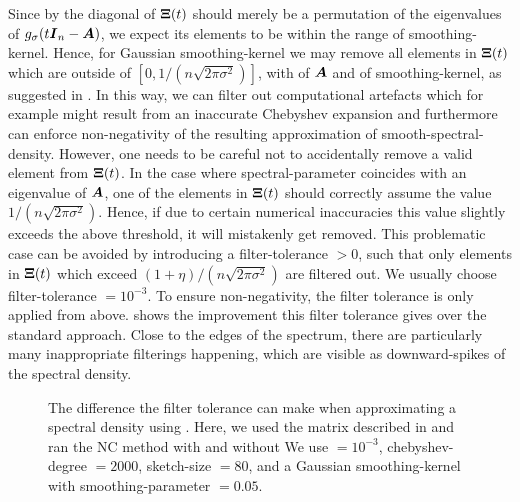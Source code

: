 Since by  the diagonal of $\boldsymbol{\Xi}(t)$
should merely be a permutation of the eigenvalues of $g_{\sigma}(t\boldsymbol{I}_n - \boldsymbol{A})$,
we expect its elements to be within the range of \gls{smoothing-kernel}. Hence,
for Gaussian \gls{smoothing-kernel} we may remove
all elements in $\boldsymbol{\Xi}(t)$ which are outside of $[0, 1 / (n \sqrt{2 \pi \sigma^2})]$,
with  of $\boldsymbol{A}$ and  of \gls{smoothing-kernel},
as suggested in \cite{lin2017randomized}.
In this way, we can filter out computational artefacts which for example might result
from an inaccurate Chebyshev expansion and furthermore 
can enforce non-negativity of the resulting approximation of
\gls{smooth-spectral-density}. However, one needs to be careful not to accidentally
remove a valid element from $\boldsymbol{\Xi}(t)$. In the case where \gls{spectral-parameter}
coincides with an eigenvalue of $\boldsymbol{A}$, one of the elements in $\boldsymbol{\Xi}(t)$
should correctly assume the value $1 / (n \sqrt{2 \pi \sigma^2})$. Hence, if due to
certain numerical inaccuracies this value slightly exceeds the above threshold,
it will mistakenly get removed. This problematic case can be avoided by introducing a
\gls{filter-tolerance} $>0$, such that only elements in $\boldsymbol{\Xi}(t)$ which
exceed $ (1 + \eta) / (n \sqrt{2 \pi \sigma^2})$ are filtered out. We usually
choose \gls{filter-tolerance} $=10^{-3}$. To ensure
non-negativity, the filter tolerance is only applied from above. 
shows the improvement this filter tolerance gives over the standard approach.
Close to the edges of the spectrum, there are particularly many inappropriate
filterings happening, which are visible as downward-spikes of the spectral density.

\begin{figure}[ht]
    \centering
    
    \caption{The difference the filter tolerance can make when approximating
        a spectral density using . 
        Here, we used the matrix described in 
        and ran the \gls{NC} method with and without 
        We use  $= 10^{-3}$,
        \gls{chebyshev-degree} $=2000$, \gls{sketch-size} $=80$, and a
        Gaussian \gls{smoothing-kernel} with \gls{smoothing-parameter} $=0.05$.}
    \label{fig:3-nystrom-filter-tolerance}
\end{figure}

